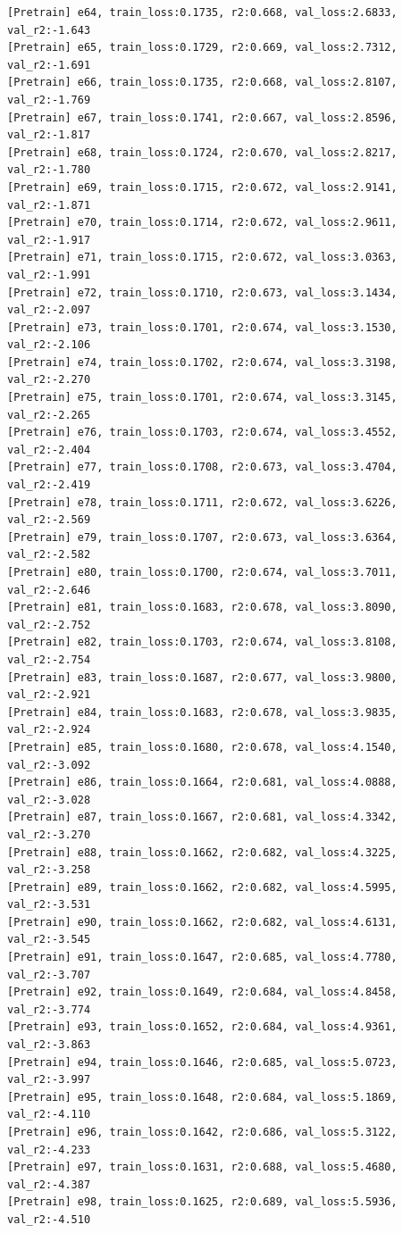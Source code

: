 \documentclass[a4paper, 12pt]{article}
\begin{document}
\begin{lstlisting}
[Pretrain] e64, train_loss:0.1735, r2:0.668, val_loss:2.6833, val_r2:-1.643
[Pretrain] e65, train_loss:0.1729, r2:0.669, val_loss:2.7312, val_r2:-1.691
[Pretrain] e66, train_loss:0.1735, r2:0.668, val_loss:2.8107, val_r2:-1.769
[Pretrain] e67, train_loss:0.1741, r2:0.667, val_loss:2.8596, val_r2:-1.817
[Pretrain] e68, train_loss:0.1724, r2:0.670, val_loss:2.8217, val_r2:-1.780
[Pretrain] e69, train_loss:0.1715, r2:0.672, val_loss:2.9141, val_r2:-1.871
[Pretrain] e70, train_loss:0.1714, r2:0.672, val_loss:2.9611, val_r2:-1.917
[Pretrain] e71, train_loss:0.1715, r2:0.672, val_loss:3.0363, val_r2:-1.991
[Pretrain] e72, train_loss:0.1710, r2:0.673, val_loss:3.1434, val_r2:-2.097
[Pretrain] e73, train_loss:0.1701, r2:0.674, val_loss:3.1530, val_r2:-2.106
[Pretrain] e74, train_loss:0.1702, r2:0.674, val_loss:3.3198, val_r2:-2.270
[Pretrain] e75, train_loss:0.1701, r2:0.674, val_loss:3.3145, val_r2:-2.265
[Pretrain] e76, train_loss:0.1703, r2:0.674, val_loss:3.4552, val_r2:-2.404
[Pretrain] e77, train_loss:0.1708, r2:0.673, val_loss:3.4704, val_r2:-2.419
[Pretrain] e78, train_loss:0.1711, r2:0.672, val_loss:3.6226, val_r2:-2.569
[Pretrain] e79, train_loss:0.1707, r2:0.673, val_loss:3.6364, val_r2:-2.582
[Pretrain] e80, train_loss:0.1700, r2:0.674, val_loss:3.7011, val_r2:-2.646
[Pretrain] e81, train_loss:0.1683, r2:0.678, val_loss:3.8090, val_r2:-2.752
[Pretrain] e82, train_loss:0.1703, r2:0.674, val_loss:3.8108, val_r2:-2.754
[Pretrain] e83, train_loss:0.1687, r2:0.677, val_loss:3.9800, val_r2:-2.921
[Pretrain] e84, train_loss:0.1683, r2:0.678, val_loss:3.9835, val_r2:-2.924
[Pretrain] e85, train_loss:0.1680, r2:0.678, val_loss:4.1540, val_r2:-3.092
[Pretrain] e86, train_loss:0.1664, r2:0.681, val_loss:4.0888, val_r2:-3.028
[Pretrain] e87, train_loss:0.1667, r2:0.681, val_loss:4.3342, val_r2:-3.270
[Pretrain] e88, train_loss:0.1662, r2:0.682, val_loss:4.3225, val_r2:-3.258
[Pretrain] e89, train_loss:0.1662, r2:0.682, val_loss:4.5995, val_r2:-3.531
[Pretrain] e90, train_loss:0.1662, r2:0.682, val_loss:4.6131, val_r2:-3.545
[Pretrain] e91, train_loss:0.1647, r2:0.685, val_loss:4.7780, val_r2:-3.707
[Pretrain] e92, train_loss:0.1649, r2:0.684, val_loss:4.8458, val_r2:-3.774
[Pretrain] e93, train_loss:0.1652, r2:0.684, val_loss:4.9361, val_r2:-3.863
[Pretrain] e94, train_loss:0.1646, r2:0.685, val_loss:5.0723, val_r2:-3.997
[Pretrain] e95, train_loss:0.1648, r2:0.684, val_loss:5.1869, val_r2:-4.110
[Pretrain] e96, train_loss:0.1642, r2:0.686, val_loss:5.3122, val_r2:-4.233
[Pretrain] e97, train_loss:0.1631, r2:0.688, val_loss:5.4680, val_r2:-4.387
[Pretrain] e98, train_loss:0.1625, r2:0.689, val_loss:5.5936, val_r2:-4.510

\end{lstlisting}
\end{document}
